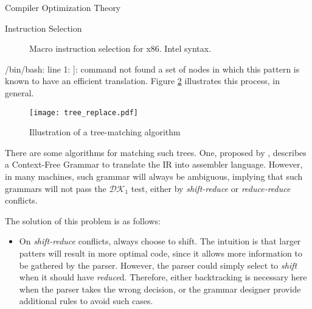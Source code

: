 \begin{section}{Compiler Optimization Theory}
\begin{subsection}{Instruction Selection}
\begin{figure}
\begin{center}
{
}
\end{center}
\caption{Macro instruction selection for x86. Intel syntax.}
\label{fig:macro_exp}
\end{figure}


/bin/bash: line 1: ]: command not found
	a set of nodes in which this pattern is known to have an efficient translation.
	Figure \ref{fig:tree-matching} illustrates this process, in general.

\begin{figure}
\centering
	 \texttt{[image: tree\_replace.pdf]}
	  \caption{Illustration of a tree-matching algorithm}
	  \label{fig:tree-matching}
\end{figure}

	There are some algorithms for matching such trees. One, proposed by
	\cite{glanville1978}, describes a Context-Free Grammar to translate
	the IR into assembler language. However, in many machines, such grammar
	will always be ambiguous, implying that such grammars will not pass
	the $\mathcal{DK}_1$ test, either by \textit{shift-reduce} or
	\textit{reduce-reduce} conflicts.

	The solution of this problem is as follows:

	\begin{itemize}
		\item On \textit{shift-reduce} conflicts,
	always choose to shift. The intuition is that larger patters will result in
	more optimal code, since it allows more information to be gathered by the parser.
	However, the parser could simply select to \textit{shift} when it should have
	\textit{reduce}d. Therefore, either backtracking is necessary here when the parser
	takes the wrong decision, or the grammar designer provide additional rules to avoid
	such cases.
	

\end{itemize}
\end{subsection}
\end{section}
